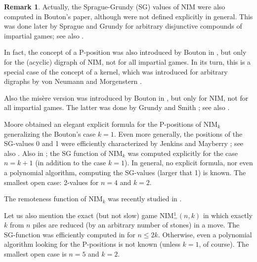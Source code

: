 \documentclass[10pt]{article}
\theoremstyle{definition}
\newtheorem{remark}{Remark}
\begin{document}
\begin{remark} 
Actually, the Sprague-Grundy (SG) values
of NIM were also computed in Bouton's paper, 
although were not defined explicitly in general. This 
was done later by Sprague \cite{Spr36} 
and Grundy \cite{Gru39} for 
arbitrary disjunctive compounds 
of impartial games; see also \cite{Con76,Smi66}. 

In fact, the concept of a P-position 
was also introduced by Bouton in \cite{Bou901}, 
but only for the (acyclic) digraph of NIM, 
not for all impartial games. 
In its turn, this is a special case 
of the concept of a kernel, 
which was introduced for arbitrary digraphs 
by von Neumann and Morgenstern \cite{NM44}. 

Also the mis\`ere version 
was introduced by Bouton in \cite{Bou901},  
but only for NIM, not for all impartial games. 
The latter was done by Grundy and Smith 
\cite{GS56}; see also \cite{Con76,Gur07,Gur07a,GH18,Smi66}.
\end{remark} 

Moore \cite{Moo910} obtained an elegant explicit formula 
for the P-positions of NIM$_k$ 
generalizing the Bouton's case  $k=1$. 
Even more generally, the positions 
of the SG-values 0 and 1  were efficiently characterized by 
Jenkins and Mayberry \cite{JM80}; see also 
\cite[Section 4]{BGHMM17}.  
Also in \cite{JM80};
the SG function of NIM$_k$  
was computed explicitly for the case  $n = k+1$ 
(in addition to the case $k=1$).  
In general, no explicit formula, 
nor even a polynomial algorithm, 
computing the SG-values 
(larger that 1)  is known. 
The smallest open case: 
2-values for  $n=4$ and $k=2$. 

\medskip 

The remoteness function of  NIM$_k$ was recently studied 
in \cite{BGMV23}. 

\medskip 

Let us also mention 
the exact (but not slow) game NIM$^1_=(n,k)$  
\cite{BGHM15,BGHMM17} 
in which exactly $k$ from $n$ piles are reduced 
(by an arbitrary number of stones) in a move. 
The SG-function was efficiently computed 
in \cite{BGHM15,BGHMM17} for $n \leq 2k$. 
Otherwise, even a polynomial algorithm 
looking for the P-positions is not known
(unless $k=1$, of course). 
The smallest open case is  $n=5$  and  $k=2$.
\end{document}
